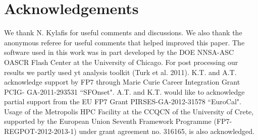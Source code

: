 \documentclass{mn2e}
\begin{document}
\section*{Acknowledgements}

We thank N. Kylafis for useful comments and discussions. We also thank the anonymous referee for useful comments that helped improved this paper. The software used in this work was in part developed by the DOE NNSA-ASC OASCR Flash Center at the University of Chicago. For post processing our results we partly used yt analysis toolkit (Turk et al. 2011). K.T. and A.T. acknowledge support by FP7 through Marie Curie Career Integration Grant PCIG- GA-2011-293531 ``SFOnset". A.T. and K.T. would like to acknowledge partial support from the EU FP7 Grant PIRSES-GA-2012-31578 ``EuroCal". Usage of the Metropolis HPC Facility at the CCQCN of the University of Crete, supported  by  the European Union Seventh Framework Programme (FP7-REGPOT-2012-2013-1) under grant agreement no. 316165, is also acknowledged.
\end{document}
